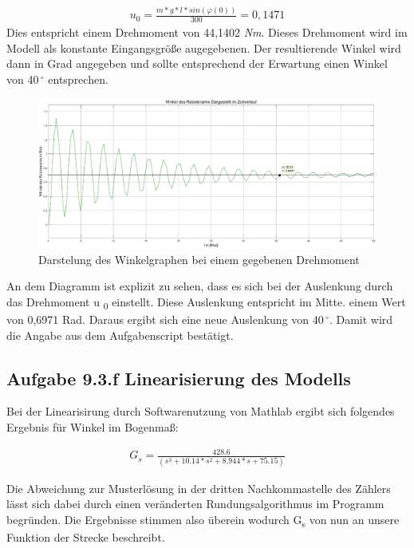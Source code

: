 \documentclass[10pt]{scrartcl}
\begin{document}
\begin{align}
   u_0 = \frac{m*g*l* sin( \varphi (0))}{300} = 0,1471
\end{align}
Dies entspricht einem Drehmoment von 44,1402 \textit N\textit m. Dieses Drehmoment wird im Modell als konstante Eingangsgröße augegebenen. Der resultierende Winkel wird dann in Grad angegeben und sollte entsprechend der Erwartung einen Winkel von 40\,$^\circ$ entsprechen.

\begin{figure}[H]
	\centering
	\includegraphics[width=1.2\textwidth]{Aufgabe9e}
	\caption{Darstelung des Winkelgraphen bei einem gegebenen Drehmoment}
	\label{img:grafik-dummy}
\end{figure}

An dem Diagramm ist explizit zu sehen, dass es sich bei der Auslenkung durch das Drehmoment u \textsubscript{0} einstellt. Diese Auslenkung entspricht im Mitte. einem Wert von 0,6971 Rad. Daraus ergibt sich eine neue Auslenkung von 40\,$^\circ$. Damit wird die Angabe aus dem Aufgabenscript bestätigt.




\subsection{Aufgabe 9.3.f Linearisierung des Modells}

Bei der Linearisirung durch Softwarenutzung von Mathlab ergibt sich folgendes Ergebnis für Winkel im Bogenmaß:

\begin{align}
   G_s = \frac{428.6}{(s^3 + 10.14*s^2 + 8.944*s + 75.15)} 
\end{align}

Die Abweichung zur Musterlösung in der dritten Nachkommastelle des Zählers lässt sich dabei durch einen veränderten Rundungsalgorithmus im Programm begründen. 
Die Ergebnisse stimmen also überein wodurch G\textsubscript{s} von nun an unsere Funktion der Strecke beschreibt.
\end{document}

